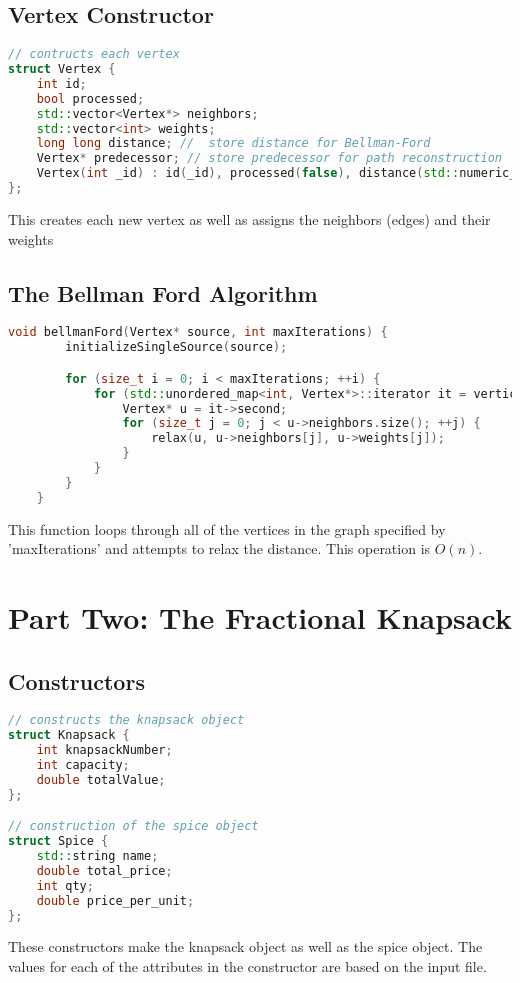 \documentclass[letterpaper, 10pt,DIV=13]{scrartcl}
\numberwithin{equation}{section} %
\numberwithin{figure}{section} %
\numberwithin{table}{section} %
\begin{document}
\subsection{Vertex Constructor}
\begin{lstlisting}[language=c++, caption= Constructing the Vertex Object]
// contructs each vertex
struct Vertex {
    int id;
    bool processed;
    std::vector<Vertex*> neighbors;
    std::vector<int> weights;
    long long distance; //  store distance for Bellman-Ford
    Vertex* predecessor; // store predecessor for path reconstruction
    Vertex(int _id) : id(_id), processed(false), distance(std::numeric_limits<int>::max()), predecessor(nullptr) {}
};
\end{lstlisting}
This creates each new vertex as well as assigns the neighbors (edges) and their weights

\subsection{The Bellman Ford Algorithm}

\begin{lstlisting}[language=c++, caption= Bellman-Ford Algorithm]
    void bellmanFord(Vertex* source, int maxIterations) {
        initializeSingleSource(source);

        for (size_t i = 0; i < maxIterations; ++i) {
            for (std::unordered_map<int, Vertex*>::iterator it = vertices.begin(); it != vertices.end(); ++it) {
                Vertex* u = it->second;
                for (size_t j = 0; j < u->neighbors.size(); ++j) {
                    relax(u, u->neighbors[j], u->weights[j]);
                }
            }
        }
    }
\end{lstlisting}
This function  loops through all of the vertices in the graph specified by 'maxIterations' and attempts to relax the distance. This operation is $O(n)$.
\newpage
\section{Part Two: The Fractional Knapsack}
\subsection{Constructors}
\begin{lstlisting}[language=c++, caption= Spice and Knapsack Constructor]
// constructs the knapsack object 
struct Knapsack {
    int knapsackNumber;
    int capacity;
    double totalValue;
};

// construction of the spice object 
struct Spice {
    std::string name;
    double total_price;
    int qty;
    double price_per_unit;
};
\end{lstlisting}
These constructors make the knapsack object as well as the spice object. The values for each of the attributes in the constructor are based on the input file.
\end{document}
